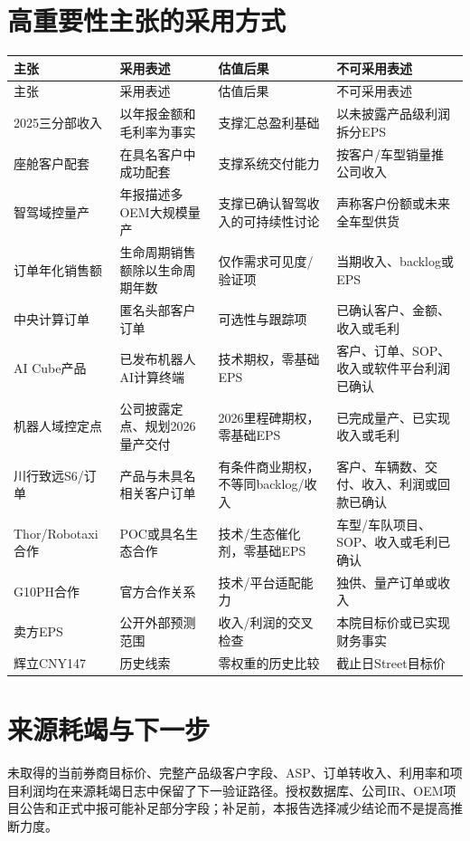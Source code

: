 \section{高重要性主张的采用方式}

\begin{longtable}{L{2.8cm}L{3.2cm}L{3.0cm}L{3.0cm}}
\toprule
主张 & 采用表述 & 估值后果 & 不可采用表述 \\
\midrule
\endfirsthead
\toprule
主张 & 采用表述 & 估值后果 & 不可采用表述 \\
\midrule
\endhead
2025三分部收入 & 以年报金额和毛利率为事实 & 支撑汇总盈利基础 & 以未披露产品级利润拆分EPS \\
座舱客户配套 & 在具名客户中成功配套 & 支撑系统交付能力 & 按客户/车型销量推公司收入 \\
智驾域控量产 & 年报描述多OEM大规模量产 & 支撑已确认智驾收入的可持续性讨论 & 声称客户份额或未来全车型供货 \\
订单年化销售额 & 生命周期销售额除以生命周期年数 & 仅作需求可见度/验证项 & 当期收入、backlog或EPS \\
中央计算订单 & 匿名头部客户订单 & 可选性与跟踪项 & 已确认客户、金额、收入或毛利 \\
AI Cube产品 & 已发布机器人AI计算终端 & 技术期权，零基础EPS & 客户、订单、SOP、收入或软件平台利润已确认 \\
机器人域控定点 & 公司披露定点、规划2026量产交付 & 2026里程碑期权，零基础EPS & 已完成量产、已实现收入或毛利 \\
川行致远S6/订单 & 产品与未具名相关客户订单 & 有条件商业期权，不等同backlog/收入 & 客户、车辆数、交付、收入、利润或回款已确认 \\
Thor/Robotaxi合作 & POC或具名生态合作 & 技术/生态催化剂，零基础EPS & 车型/车队项目、SOP、收入或毛利已确认 \\
G10PH合作 & 官方合作关系 & 技术/平台适配能力 & 独供、量产订单或收入 \\
卖方EPS & 公开外部预测范围 & 收入/利润的交叉检查 & 本院目标价或已实现财务事实 \\
辉立CNY147 & 历史线索 & 零权重的历史比较 & 截止日Street目标价 \\
\bottomrule
\end{longtable}

\section{来源耗竭与下一步}

未取得的当前券商目标价、完整产品级客户字段、ASP、订单转收入、利用率和项目利润均在来源耗竭日志中保留了下一验证路径。授权数据库、公司IR、OEM项目公告和正式中报可能补足部分字段；补足前，本报告选择减少结论而不是提高推断力度。
